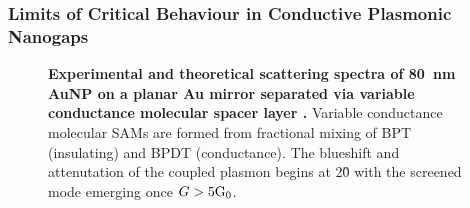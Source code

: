 \documentclass{article}
\begin{document}
\subsubsection{Limits of Critical Behaviour in Conductive Plasmonic Nanogaps}

\begin{figure}[bt]
\centering
\vspace{-10pt}
\caption[Experimental and theoretical scattering spectra of \SI{80}{nm} AuNP dimers connected via variable conductance molecular linkers \cite{benz2014}]{\textbf{Experimental and theoretical scattering spectra of \SI{80}{nm} AuNP on a planar Au mirror separated via variable conductance molecular spacer layer \cite{benz2014}.} Variable conductance molecular SAMs are formed from fractional mixing of BPT (insulating) and BPDT (conductance). The blueshift and attenutation of the coupled plasmon begins at 2\G0 with the screened mode emerging once $G>5\mathrm{G_{0}}$.}
\label{fig:benz_molecular_npom}
\vspace{-5pt}
\end{figure}
\end{document}
